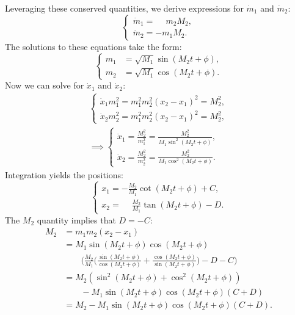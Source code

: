 \documentclass[english,master]{liumaiex}
\theoremstyle{plain}
\theoremstyle{definition}
\begin{document}
%
Leveraging these conserved quantities, we derive expressions for $\dot{m}_1$ and $\dot{m}_2$:
\begin{equation}
\left\{ \begin{aligned}
	\dot{m}_1 = \phantom{-}m_2M_2, \\
	\dot{m}_2 = -m_1M_2.
\end{aligned} \right.
\end{equation}
%
The solutions to these equations take the form:
\begin{equation}
\left\{ \begin{aligned}
	m_1 &= \sqrt{M_1} \sin(M_2t + \phi), \\
	m_2 &= \sqrt{M_1} \cos(M_2t + \phi).
\end{aligned} \right.
\end{equation}
%
Now we can solve for $\dot{x}_1$ and $\dot{x}_2$:
\begin{align}
\left\{ \begin{aligned}
	\dot{x}_1m_1^2 = m_1^2m_2^2(x_2 - x_1)^2 = M_2^2, \\
	\dot{x}_2m_2^2 = m_1^2m_2^2(x_2 - x_1)^2 = M_2^2,
\end{aligned} \right. \\
\implies \left\{ \begin{aligned}
	\dot{x}_1 = \frac{M_2^2}{m_1^2} = \frac{M_2^2}{M_1\sin^2(M_2t + \phi)}, \\
	\dot{x}_2 = \frac{M_2^2}{m_2^2} = \frac{M_2^2}{M_1\cos^2(M_2t + \phi)}.
\end{aligned} \right.
\end{align}
%
Integration yields the positions:
\begin{equation}
\left\{ \begin{aligned}
	x_1 = -\frac{M_2}{M_1}\cot(M_2t + \phi) + C,\\
	x_2 = \phantom{-}\frac{M_2}{M_1}\tan(M_2t + \phi) - D.
\end{aligned} \right.
\end{equation}
%
The $M_2$ quantity implies that $D = -C$:
\begin{equation}
\begin{aligned}
	M_2 &= m_1m_2(x_2 - x_1) \\
	&= M_1 \sin(M_2t + \phi) \cos(M_2t + \phi) \\
	& \qquad \Big( \frac{M_2}{M_1} \Big(\frac{\sin(M_2t + \phi)}{\cos(M_2t + \phi)} +
	\frac{\cos(M_2t + \phi)}{\sin(M_2t + \phi)}\Big) - D - C \Big) \\
	&= M_2(\sin^2(M_2t + \phi) + \cos^2(M_2t + \phi)) \\
	& \qquad - M_1 \sin(M_2t + \phi) \cos(M_2t + \phi)(C + D) \\
	&= M_2 - M_1 \sin(M_2t + \phi) \cos(M_2t + \phi)(C + D).
\end{aligned}
\end{equation}
\end{document}
